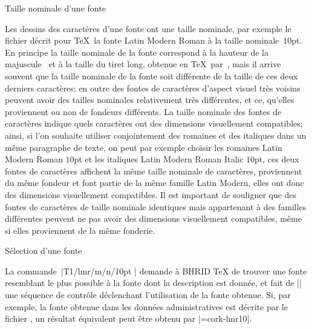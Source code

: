 \formalpar Taille nominale d'une fonte

Les dessins des caractères d'une fonte ont une taille nominale, par
exemple le fichier  décrit pour \TeX\ la fonte Latin
Modern Roman à la taille nominale~$10$pt. En principe la taille
nominale de la fonte correspond à la hauteur de la majuscule~
et à la taille du tiret long, obtenue en \TeX\ par~\li{-{}-{}-}, mais
il arrive souvent que la taille nominale de la fonte soit différente
de la taille de ces deux derniers caractères; en outre des fontes de
caractères d'aspect visuel très voisins peuvent avoir des tailles
nominales relativement très différentes, et ce, qu'elles proviennent
ou non de fondeurs différents. La taille nominale des fontes de
caractères indique quels caractères ont des dimensions visuellement
compatibles; ainsi, si l'on souhaite utiliser conjointement des
romaines et des italiques dans un même paragraphe de texte, on peut
par exemple choisir les romaines Latin Modern Roman $10$pt et les
italiques Latin Modern Roman Italic $10$pt, ces deux fontes de
caractères affichent la même taille nominale de caractères,
proviennent du même fondeur et font partie de la même famille Latin
Modern, elles ont donc des dimensions visuellement compatibles. Il est
important de souligner que des fontes de caractères de taille nominale
identiques mais appartenant à des familles différentes peuvent ne pas
avoir des dimensions visuellement compatibles, même si elles
proviennent de la même fonderie.


\formalpar Sélection d'une fonte

La commande~|\fontwish T1/lmr/m/n/10pt \as\tenrm| demande à BHRID \TeX
de trouver une fonte resemblant le plus possible à la fonte dont la
description est donnée, et fait de |\tenrm| une séquence de contrôle
déclenchant l'utilisation de la fonte obtenue. Si, par exemple, la
fonte obtenue dans les données administratives est décrite par le
fichier , un résultat équivalent peut être obtenu par
|\font\tenrm=cork-lmr10|.

